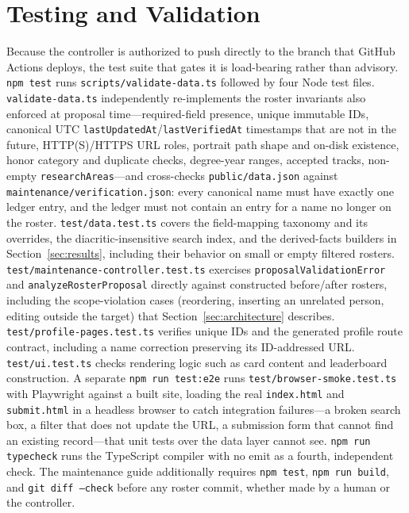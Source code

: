 \documentclass[11pt]{article}
\newcommand{\code}[1]{\texttt{\small #1}}
\begin{document}
\section{Testing and Validation}
\label{sec:testing}
Because the controller is authorized to push directly to the branch that GitHub Actions deploys, the test suite that gates it is load-bearing rather than advisory.
\code{npm test} runs \code{scripts/validate-data.ts} followed by four Node test files.
\code{validate-data.ts} independently re-implements the roster invariants also enforced at proposal time---required-field presence, unique immutable IDs, canonical UTC \code{lastUpdatedAt}/\code{lastVerifiedAt} timestamps that are not in the future, HTTP(S)/HTTPS URL roles, portrait path shape and on-disk existence, honor category and duplicate checks, degree-year ranges, accepted tracks, non-empty \code{researchAreas}---and cross-checks \code{public/data.json} against \code{maintenance/verification.json}: every canonical name must have exactly one ledger entry, and the ledger must not contain an entry for a name no longer on the roster.
\code{test/data.test.ts} covers the field-mapping taxonomy and its overrides, the diacritic-insensitive search index, and the derived-facts builders in Section~\ref{sec:results}, including their behavior on small or empty filtered rosters.
\code{test/maintenance-controller.test.ts} exercises \code{proposalValidationError} and \code{analyzeRosterProposal} directly against constructed before/after rosters, including the scope-violation cases (reordering, inserting an unrelated person, editing outside the target) that Section~\ref{sec:architecture} describes.
\code{test/profile-pages.test.ts} verifies unique IDs and the generated profile route contract, including a name correction preserving its ID-addressed URL.
\code{test/ui.test.ts} checks rendering logic such as card content and leaderboard construction.
A separate \code{npm run test:e2e} runs \code{test/browser-smoke.test.ts} with Playwright against a built site, loading the real \code{index.html} and \code{submit.html} in a headless browser to catch integration failures---a broken search box, a filter that does not update the URL, a submission form that cannot find an existing record---that unit tests over the data layer cannot see.
\code{npm run typecheck} runs the TypeScript compiler with no emit as a fourth, independent check.
The maintenance guide additionally requires \code{npm test}, \code{npm run build}, and \code{git diff --check} before any roster commit, whether made by a human or the controller.
\end{document}

